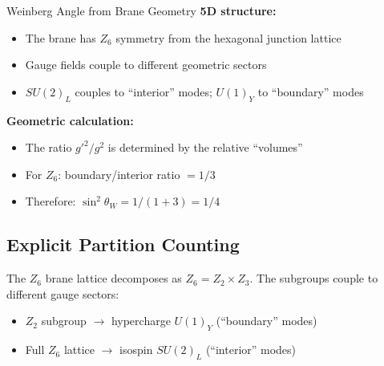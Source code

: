 \begin{mechanism}{Weinberg Angle from Brane Geometry}
\textbf{5D structure:}
\begin{itemize}[nosep]
\item The brane has $Z_6$ symmetry from the hexagonal junction lattice
\item Gauge fields couple to different geometric sectors
\item $SU(2)_L$ couples to ``interior'' modes; $U(1)_Y$ to ``boundary'' modes
\end{itemize}

\textbf{Geometric calculation:}
\begin{itemize}[nosep]
\item The ratio $g'^2/g^2$ is determined by the relative ``volumes''
\item For $Z_6$: boundary/interior ratio $= 1/3$
\item Therefore: $\sin^2\theta_W = 1/(1+3) = 1/4$
\end{itemize}
\end{mechanism}

\subsection{Explicit Partition Counting}

The $Z_6$ brane lattice decomposes as $Z_6 = Z_2 \times Z_3$. The subgroups
couple to different gauge sectors:
\begin{itemize}[nosep]
\item $Z_2$ subgroup $\to$ hypercharge $U(1)_Y$ (``boundary'' modes)
\item Full $Z_6$ lattice $\to$ isospin $SU(2)_L$ (``interior'' modes)
\end{itemize}

